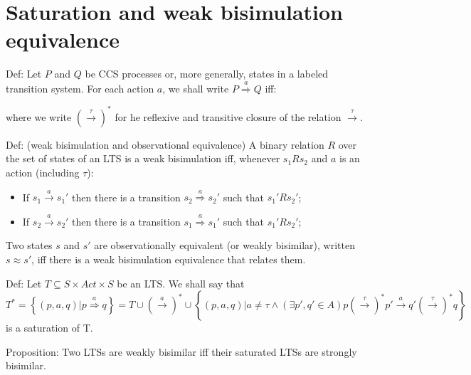 \section{Saturation and weak bisimulation equivalence}
Def: Let $P$ and $Q$ be CCS processes or, more generally, states in a labeled transition system. For each action $a$, we shall write
$P\stackrel{a}{\Rightarrow}Q$ iff:
\begin{itemize}
	\item Either $a\neq\tau$ and there are processes $P'$ and $Q'$ such that $P\left(\stackrel{\tau}{\rightarrow}\right)^{*}P'\ \stackrel{a}{\rightarrow}\ Q'\left(\stackrel{\tau}{\rightarrow}\right)^{*}Q$,
	\item Or $a=\tau}$ and ${P\left(\stackrel{\tau}{\rightarrow}\right)^{*}Q$,
\end{itemize}
where we write $\left(\stackrel{\tau}{\rightarrow}\right)^{*}$ for he reflexive and transitive closure of the relation $\stackrel{\tau}{\rightarrow}$.

Def: (weak bisimulation and observational equivalence) A binary relation $R$ over the set of states of an LTS is a weak bisimulation iff, whenever $s_{1}Rs_{2}$ and $a$ is an action (including $\tau$):
\begin{itemize}
	\item If $s_{1}\stackrel{a}{\rightarrow}s_{1}'$ then there is a transition $s_{2}\stackrel{a}{\Rightarrow}s_{2}'$ such that $s_{1}'Rs_{2}'$;
	\item If $s_{2}\stackrel{a}{\rightarrow}s_{2}'$ then there is a transition $s_{1}\stackrel{a}{\Rightarrow}s_{1}'$ such that $s_{1}'Rs_{2}'$;
\end{itemize}

Two states $s$ and $s'$ are observationally equivalent (or weakly bisimilar), written $s\approx s'$, iff there is a weak bisimulation equivalence that relates them.

Def: Let $T\subseteq S\times Act\times S$ be an LTS. We shall say that\\ 
$T^{*}=\left\{\left(p,a,q\right)| p\stackrel{a}{\Rightarrow}q\right\}=T\cup\left(\stackrel{a}{\rightarrow}\right)^{*}\cup\left\{\left(p,a,q\right)| a\neq\tau\wedge\left(\exists p',q'\in A\right) p\left(\stackrel{\tau}{\rightarrow}\right)^{*}p'\stackrel{a}{\rightarrow}q'\left(\stackrel{\tau}{\rightarrow}\right)^{*}q\right\}$ is a saturation of T.

Proposition: Two LTSs are weakly bisimilar iff their saturated LTSs are strongly bisimilar. 


